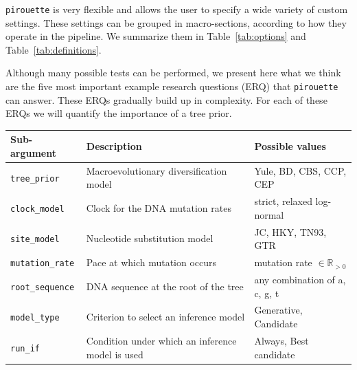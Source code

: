 \verb;pirouette; is very flexible and allows the user 
to specify a wide variety of custom settings. 
These settings can be grouped in macro-sections, 
according to how they operate in the pipeline. 
We summarize them in Table~\ref{tab:options} and Table~\ref{tab:definitions}.

Although many possible tests can be performed, 
we present here what we think are the five most important 
example research questions (ERQ) that \verb;pirouette; can answer. 
These ERQs gradually build up in complexity.
For each of these ERQs we will quantify the importance of a tree prior.

\begin{table}
\centering
  \begin{tabular}{|p{3.2cm}|p{9.7cm}|p{4.5cm}@{}|}
    \hline
    \centering
    \textbf{Sub-argument} & 
    \textbf{Description} &
    \textbf{Possible values} \\ 
    \hline
    \verb;tree_prior; &
    Macroevolutionary diversification model &
    Yule, BD, CBS, CCP, CEP \\
    \verb;clock_model; &
    Clock for the DNA mutation rates &
    strict, relaxed log-normal \\
    \verb;site_model; &
    Nucleotide substitution model &
    JC, HKY, TN93, GTR \\
    \verb;mutation_rate; &
    Pace at which mutation occurs &
    mutation rate $\in \mathbb{R}_{>0}$\\
    \verb;root_sequence; &
    DNA sequence at the root of the tree &
    any combination of a, c, g, t \\
    \verb;model_type; &
    Criterion to select an inference model &
    Generative, Candidate \\
    \verb;run_if; &
    Condition under which an inference model is used &
    Always, Best candidate \\

\end{tabular}
\end{table}
